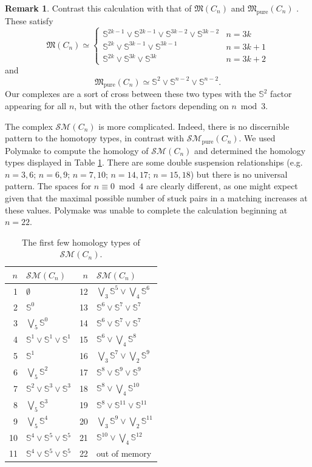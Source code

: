 \documentclass{amsart}
\theoremstyle{definition}
\newtheorem{remark}[theorem]{Remark}
\newcommand{\zs}{{\mathbb S}}
\newcommand{\sm}{{\mathcal{SM}}}
\newcommand{\smpure}{{\mathcal{SM}}_{\textrm{pure}}}
\begin{document}
\begin{remark}
    Contrast this calculation with that of ${\mathfrak M}(C_n)$ \cite{Kozlov1999} and ${\mathfrak M}_{\textrm{pure}}(C_n)$ \cite{ChariJoswig2005}. These satisfy
    $${\mathfrak M}(C_n) \simeq \begin{cases}
        \zs^{2k-1}\vee\zs^{2k-1}\vee\zs^{3k-2}\vee\zs^{3k-2} & n=3k \\
        \zs^{2k}\vee\zs^{3k-1}\vee\zs^{3k-1} & n=3k+1 \\
        \zs^{2k}\vee\zs^{3k}\vee\zs^{3k} & n=3k+2
    \end{cases}$$
    and
    $${\mathfrak M}_\textrm{pure}(C_n) \simeq \zs^2\vee\zs^{n-2}\vee\zs^{n-2}.$$
    Our complexes are a sort of cross between these two types with the $\zs^2$ factor appearing for all $n$, but with the other factors depending on $n\bmod 3$. 
\end{remark}

The complex $\sm(C_n)$ is more complicated. Indeed, there is no discernible pattern to the homotopy types, in contrast with $\smpure(C_n)$. We used Polymake to compute the homology of $\sm(C_n)$ and determined the homology types displayed in Table \ref{smtable}. There are some double suspension relationships (e.g. $n=3,6$; $n=6,9$; $n=7,10$; $n=14,17$; $n=15,18$) but there is no universal pattern. The spaces for $n\equiv 0\bmod 4$ are clearly different, as one might expect given that the maximal  possible number of stuck pairs in a matching increases at these values. Polymake was unable to complete the calculation beginning at $n=22$.

\begin{table}
\begingroup 
\renewcommand{\arraystretch}{1.4}
\begin{tabular}{r|l|r|l}
\hline
$n$ & $\sm(C_n)$ & $n$ & $\sm(C_n)$ \\
\hline
1 & $\emptyset$  & 12 & $\bigvee_3\zs^5\vee\bigvee_4\zs^6$ \\
2 & $\zs^0$  & 13 & $\zs^6\vee\zs^7\vee\zs^7$ \\
3 & $\bigvee_5 \zs^0$ & 14 & $\zs^6\vee\zs^7\vee\zs^7$ \\
4 & $\zs^1\vee\zs^1\vee\zs^1$ & 15 & $\zs^6\vee\bigvee_4\zs^8$ \\
5 &  $\zs^1    $ & 16 & $\bigvee_3\zs^7\vee\bigvee_2\zs^9$ \\
6 & $\bigvee_5\zs^2$    & 17 & $\zs^8\vee\zs^9\vee\zs^9$  \\   
7 & $\zs^2\vee\zs^3\vee\zs^3$ & 18 & $\zs^8\vee\bigvee_4\zs^{10}$ \\ 
8 & $\bigvee_5\zs^3$  & 19 & $\zs^8\vee\zs^{11}\vee\zs^{11}$ \\
9 & $\bigvee_5\zs^4$ & 20 & $\bigvee_3\zs^9\vee\bigvee_2\zs^{11}$ \\
10 & $\zs^4\vee\zs^5\vee\zs^5$ & 21 & $\zs^{10}\vee\bigvee_4\zs^{12}$ \\
11 & $\zs^4\vee\zs^5\vee\zs^5$ & 22 & out of memory \\
\hline
\end{tabular}
\endgroup
\caption{\label{smtable} The first few homology types of $\sm(C_n)$.}
\end{table}
\end{document}
